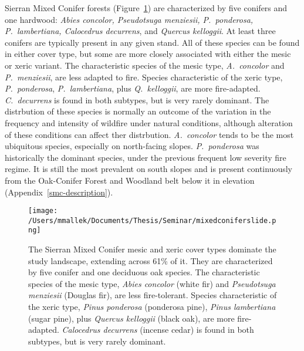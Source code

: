 Sierran Mixed Conifer forests (Figure~\ref{fig:smctrees}) are characterized by five conifers and one hardwood: \emph{Abies concolor, Pseudotsuga menziesii, P.~ponderosa, P.~lambertiana, Calocedrus decurrens}, and \emph{Quercus kelloggii}. At least three conifers are typically present in any given stand. All of these species can be found in either cover type, but some are more closely associated with either the mesic or xeric variant. The characteristic species of the mesic type, \emph{A.~concolor} and \emph{P.~menziesii}, are less adapted to fire. Species characteristic of the xeric type, \emph{P.~ponderosa}, \emph{P.~lambertiana}, plus \emph{Q.~kelloggii}, are more fire-adapted. \emph{C.~decurrens} is found in both subtypes, but is very rarely dominant. The distrbution of these species is normally an outcome of the variation in the frequency and intensity of wildfire under natural conditions, although alteration of these conditions can affect ther distrbution. \emph{A.~concolor} tends to be the most ubiquitous species, especially on north-facing slopes. \emph{P.~ponderosa} was historically the dominant species, under the previous frequent low severity fire regime. It is still the most prevalent on south slopes and is present continuously from the Oak-Conifer Forest and Woodland belt below it in elevation (Appendix~\ref{smc-description}).


\begin{figure}[!htbp]
\centering
\texttt{[image: /Users/mmallek/Documents/Thesis/Seminar/mixedconiferslide.png]}
\caption{The Sierran Mixed Conifer mesic and xeric cover types dominate the study landscape, extending across 61\% of it. They are characterized by five conifer and one deciduous oak species. The characteristic species of the mesic type, \emph{Abies concolor} (white fir) and \emph{Pseudotsuga menziesii} (Douglas fir), are less fire-tolerant. Species characteristic of the xeric type, \emph{Pinus ponderosa} (ponderosa pine), \emph{Pinus lambertiana} (sugar pine), plus \emph{Quercus kelloggii} (black oak), are more fire-adapted. \emph{Calocedrus decurrens} (incense cedar) is found in both subtypes, but is very rarely dominant.}
\label{fig:smctrees}
\end{figure}


